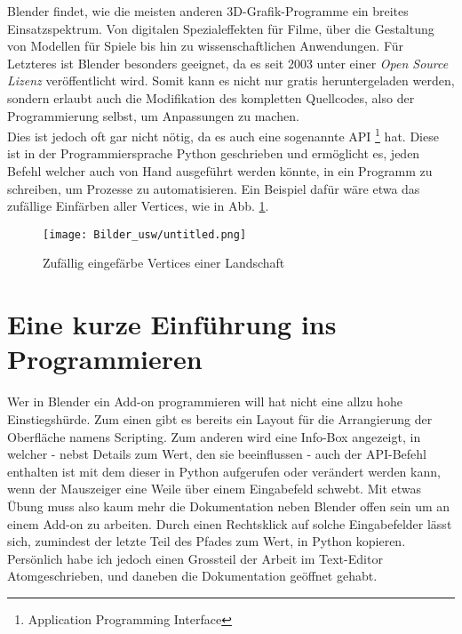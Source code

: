 \documentclass[12pt,twoside]{book}
\begin{document}
Blender findet, wie die meisten anderen 3D-Grafik-Programme ein breites Einsatzspektrum. Von digitalen Spezialeffekten f\"ur Filme, \"uber die Gestaltung von Modellen f\"ur Spiele bis hin zu wissenschaftlichen Anwendungen. F\"ur Letzteres ist Blender besonders geeignet, da es seit 2003 unter einer \textit{Open Source Lizenz} ver\"offentlicht wird. Somit kann es nicht nur gratis heruntergeladen werden, sondern erlaubt auch die Modifikation des kompletten Quellcodes, also der Programmierung selbst, um Anpassungen zu machen.\\
Dies ist jedoch oft gar nicht n\"otig, da es auch eine sogenannte API \footnote{Application Programming Interface} hat. Diese ist in der Programmiersprache Python geschrieben und erm\"oglicht es, jeden Befehl welcher auch von Hand ausgef\"uhrt werden k\"onnte, in ein Programm zu schreiben, um Prozesse zu automatisieren. Ein Beispiel daf\"ur w\"are etwa das zuf\"allige Einf\"arben aller Vertices, wie in Abb. \ref{fig:randomColor}. 

\begin{figure}[H]
\centering
\texttt{[image: Bilder\_usw/untitled.png]}
\caption{Zuf\"allig eingef\"arbe Vertices einer Landschaft }
\label{fig:randomColor}
\centering
\end{figure}
                                                                                  
\chapter{Eine kurze Einf\"uhrung ins Programmieren}
Wer in Blender ein Add-on programmieren will hat nicht eine allzu hohe Einstiegsh\"urde.
Zum einen gibt es bereits ein Layout f\"ur die Arrangierung der Oberfl\"ache namens \glqq Scripting\grqq. Zum anderen wird eine Info-Box angezeigt, in welcher - nebst Details zum Wert, den sie beeinflussen - auch der API-Befehl enthalten ist mit dem dieser in Python aufgerufen oder ver\"andert werden kann, wenn der Mauszeiger eine Weile \"uber einem Eingabefeld schwebt. Mit etwas \"Ubung muss also kaum mehr die Dokumentation neben Blender offen sein um an einem Add-on zu arbeiten.
Durch einen Rechtsklick auf solche Eingabefelder l\"asst sich, zumindest der letzte Teil des Pfades zum Wert, in Python kopieren.
Pers\"onlich habe ich jedoch einen Grossteil der Arbeit im Text-Editor \glqq Atom\grqq geschrieben, und daneben die Dokumentation ge\"offnet gehabt.
\end{document}
